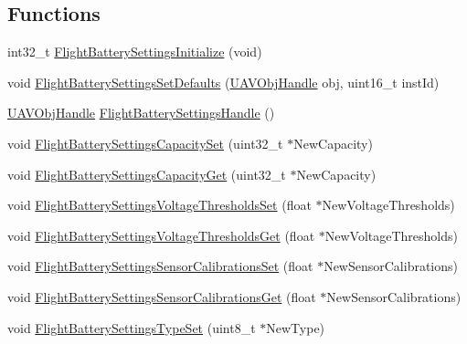 \subsection*{\-Functions}
\begin{DoxyCompactItemize}
\item 
int32\-\_\-t \hyperlink{group___flight_battery_settings_ga9c32ec0e22ec11b5c3ff5845f57f912f}{\-Flight\-Battery\-Settings\-Initialize} (void)
\item 
void \hyperlink{group___flight_battery_settings_ga9c99e3023b7188ec4879b8796e192845}{\-Flight\-Battery\-Settings\-Set\-Defaults} (\hyperlink{targets_2_u_a_v_objects_2inc_2uavobjectmanager_8h_a279053e22be53ce9f895043aaeb91e3b}{\-U\-A\-V\-Obj\-Handle} obj, uint16\-\_\-t inst\-Id)
\item 
\hyperlink{targets_2_u_a_v_objects_2inc_2uavobjectmanager_8h_a279053e22be53ce9f895043aaeb91e3b}{\-U\-A\-V\-Obj\-Handle} \hyperlink{group___flight_battery_settings_gaaa184a176ab81accd608d2d3ce0c4c70}{\-Flight\-Battery\-Settings\-Handle} ()
\item 
void \hyperlink{group___flight_battery_settings_gae35f83585c80efbb9b062b7682135b88}{\-Flight\-Battery\-Settings\-Capacity\-Set} (uint32\-\_\-t $\ast$\-New\-Capacity)
\item 
void \hyperlink{group___flight_battery_settings_ga3ad638613055fefe83f670d7a86e050f}{\-Flight\-Battery\-Settings\-Capacity\-Get} (uint32\-\_\-t $\ast$\-New\-Capacity)
\item 
void \hyperlink{group___flight_battery_settings_ga16398a5d48d7077e7f74b50a602bb5d9}{\-Flight\-Battery\-Settings\-Voltage\-Thresholds\-Set} (float $\ast$\-New\-Voltage\-Thresholds)
\item 
void \hyperlink{group___flight_battery_settings_ga95c0684f41473a4d1b62c371964957bc}{\-Flight\-Battery\-Settings\-Voltage\-Thresholds\-Get} (float $\ast$\-New\-Voltage\-Thresholds)
\item 
void \hyperlink{group___flight_battery_settings_gae88198e62a7ec050207d77ee77c58a75}{\-Flight\-Battery\-Settings\-Sensor\-Calibrations\-Set} (float $\ast$\-New\-Sensor\-Calibrations)
\item 
void \hyperlink{group___flight_battery_settings_ga6330db1343338db8950192489f44f5bf}{\-Flight\-Battery\-Settings\-Sensor\-Calibrations\-Get} (float $\ast$\-New\-Sensor\-Calibrations)
\item 
void \hyperlink{group___flight_battery_settings_gaa0b39a7dc58dac3864ff4c01e6b114e9}{\-Flight\-Battery\-Settings\-Type\-Set} (uint8\-\_\-t $\ast$\-New\-Type)
\item 

\end{DoxyCompactItemize}
